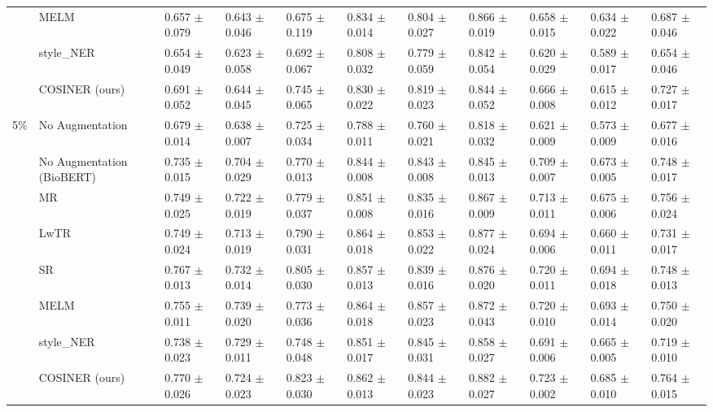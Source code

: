 \documentclass{article}
\begin{document}
\begin{table}
{{\begin{tabular}{cllll|lll|lll}
&MELM & 0.657 $\pm$ 0.079 & 0.643 $\pm$ 0.046 & 0.675 $\pm$ 0.119 & 0.834 $\pm$ 0.014 & 0.804 $\pm$ 0.027 & 0.866 $\pm$ 0.019 & 0.658 $\pm$ 0.015 & 0.634 $\pm$ 0.022 & 0.687 $\pm$ 0.046 \\
&style\_NER & 0.654 $\pm$ 0.049 & 0.623 $\pm$ 0.058 & 0.692 $\pm$ 0.067 & 0.808 $\pm$ 0.032 & 0.779 $\pm$ 0.059 & 0.842 $\pm$ 0.054 & 0.620 $\pm$ 0.029 & 0.589 $\pm$ 0.017 & 0.654 $\pm$ 0.046 \\
&COSINER (ours) & 0.691 $\pm$ 0.052 & 0.644 $\pm$ 0.045 & 0.745 $\pm$ 0.065 & 0.830 $\pm$ 0.022 & 0.819 $\pm$ 0.023 & 0.844 $\pm$ 0.052 & 0.666 $\pm$ 0.008 & 0.615 $\pm$ 0.012 & 0.727 $\pm$ 0.017 \\
\midrule
\multirow{8}{*}{5\%} & No Augmentation & 0.679 $\pm$ 0.014 & 0.638 $\pm$ 0.007 & 0.725 $\pm$ 0.034 & 0.788 $\pm$ 0.011 & 0.760 $\pm$ 0.021 & 0.818 $\pm$ 0.032 & 0.621 $\pm$ 0.009 & 0.573 $\pm$ 0.009 & 0.677 $\pm$ 0.016 \\
&No Augmentation (BioBERT) & 0.735 $\pm$ 0.015 & 0.704 $\pm$ 0.029 & 0.770 $\pm$ 0.013 & 0.844 $\pm$ 0.008 & 0.843 $\pm$ 0.008 & 0.845 $\pm$ 0.013 & 0.709 $\pm$ 0.007 & 0.673 $\pm$ 0.005 & 0.748 $\pm$ 0.017 \\
&MR & 0.749 $\pm$ 0.025 & 0.722 $\pm$ 0.019 & 0.779 $\pm$ 0.037 & 0.851 $\pm$ 0.008 & 0.835 $\pm$ 0.016 & 0.867 $\pm$ 0.009 & 0.713 $\pm$ 0.011 & 0.675 $\pm$ 0.006 & 0.756 $\pm$ 0.024 \\
&LwTR & 0.749 $\pm$ 0.024 & 0.713 $\pm$ 0.019 & 0.790 $\pm$ 0.031 & 0.864 $\pm$ 0.018 & 0.853 $\pm$ 0.022 & 0.877 $\pm$ 0.024 & 0.694 $\pm$ 0.006 & 0.660 $\pm$ 0.011 & 0.731 $\pm$ 0.017 \\
&SR & 0.767 $\pm$ 0.013 & 0.732 $\pm$ 0.014 & 0.805 $\pm$ 0.030 & 0.857 $\pm$ 0.013 & 0.839 $\pm$ 0.016 & 0.876 $\pm$ 0.020 & 0.720 $\pm$ 0.011 & 0.694 $\pm$ 0.018 & 0.748 $\pm$ 0.013 \\
&MELM & 0.755 $\pm$ 0.011 & 0.739 $\pm$ 0.020 & 0.773 $\pm$ 0.036 & 0.864 $\pm$ 0.018 & 0.857 $\pm$ 0.023 & 0.872 $\pm$ 0.043 & 0.720 $\pm$ 0.010 & 0.693 $\pm$ 0.014 & 0.750 $\pm$ 0.020 \\
&style\_NER & 0.738 $\pm$ 0.023 & 0.729 $\pm$ 0.011 & 0.748 $\pm$ 0.048 & 0.851 $\pm$ 0.017 & 0.845 $\pm$ 0.031 & 0.858 $\pm$ 0.027 & 0.691 $\pm$ 0.006 & 0.665 $\pm$ 0.005 & 0.719 $\pm$ 0.010 \\
&COSINER (ours) & 0.770 $\pm$ 0.026 & 0.724 $\pm$ 0.023 & 0.823 $\pm$ 0.030 & 0.862 $\pm$ 0.013 & 0.844 $\pm$ 0.023 & 0.882 $\pm$ 0.027 & 0.723 $\pm$ 0.002 & 0.685 $\pm$ 0.010 & 0.764 $\pm$ 0.015 \\

\end{tabular}}}
\end{table}
\end{document}
